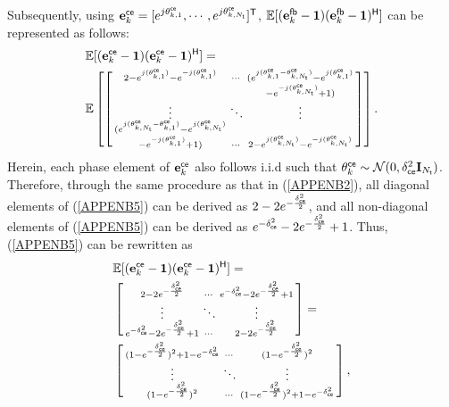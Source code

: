 \documentclass[draftclsnofoot, onecolumn, comsoc, 12pt]{IEEEtran}
\begin{document}
Subsequently, using ${\mathbf{e}_{k}^{\sf{ce}}} = [e^{j\theta_{k,1}^{\sf{ce}}}, \cdots, e^{j\theta_{k, N_{{\sf{t}}}}^{\sf{ce}}}]^{\sf{T}}$, $\mathbb{E}[({\mathbf{e}_{k}^{\sf{fb}}}-\mathbf{1})({\mathbf{e}_{k}^{\sf{fb}}}-\mathbf{1})^{\sf{H}}]$ can be represented as follows:
\begin{align} \label{APPENB5}
   &\mathbb{E}[({\mathbf{e}_{k}^{\sf{ce}}} - \mathbf{1})({\mathbf{e}_{k}^{\sf{ce}}} - \mathbf{1})^{\sf{H}}] =
    \\ 
   & \mathbb{E}\left[ \left[
   \begin{smallmatrix}
    2-e^{j(\theta_{k, 1}^{\sf{ce}})}-e^{-j(\theta_{k, 1}^{\sf{ce}})} &  \cdots &   (e^{j(\theta_{k, 1}^{\sf{ce}}-\theta_{k, N_{{\sf{t}}}}^{\sf{ce}})}-e^{j(\theta_{k, 1}^{\sf{ce}})} \\
   && -e^{-j(\theta_{k, N_{{\sf{t}}}}^{\sf{ce}})} + 1) \\ 
   \vdots&\ddots&\vdots\\
   (e^{j(\theta_{k, N_{{\sf{t}}}}^{\sf{ce}}-\theta_{k, 1}^{\sf{ce}})}-e^{j(\theta_{k, N_{{\sf{t}}}}^{\sf{ce}})} && \\
   -e^{-j(\theta_{k, 1}^{\sf{ce}})} + 1) &  \cdots &  2-e^{j(\theta_{k, N_{{\sf{t}}}}^{\sf{ce}})}-e^{-j(\theta_{k, N_{{\sf{t}}}}^{\sf{ce}})}
   \end{smallmatrix}
   \right] \right].\nonumber
\end{align}
Herein, each phase element of $\mathbf{e}_k^{\sf{ce}}$ also follows i.i.d such that $\mathbf{\theta}_{k}^{\sf{ce}}\sim\mathcal{N}{(0,\delta_{\sf{ce}}^{2} \mathbf{I}_{N_{\sf{t}}})}$.
Therefore, through the same procedure as that in (\ref{APPENB2}), all diagonal elements of (\ref{APPENB5}) can be derived as $2-2e^{-\frac{\delta_{\sf{ce}}^{2}}{2}}$, and all non-diagonal elements of (\ref{APPENB5}) can be derived as $e^{-\delta_{\sf{ce}}^{2}}-2e^{-\frac{\delta_{\sf{ce}}^{2}}{2}}+1$. 
Thus, (\ref{APPENB5}) can be rewritten as 
\begin{align} \label{APPENB6}
   &\mathbb{E}[({\mathbf{e}_{k}^{\sf{ce}}}-\mathbf{1})({\mathbf{e}_{k}^{\sf{ce}}}-\mathbf{1})^{\sf{H}}] =
   \nonumber \\
   &\left[ \begin{smallmatrix}
   2-2e^{-\frac{\delta_{\sf{ce}}^{2}}{2}}&\cdots& e^{-\delta_{\sf{ce}}^{2}}-2e^{-\frac{\delta_{\sf{ce}}^{2}}{2}}+1 \\ \vdots&\ddots&\vdots\\
   e^{-\delta_{\sf{ce}}^{2}}-2e^{-\frac{\delta_{\sf{ce}}^{2}}{2}}+1&\cdots&2-2e^{-\frac{\delta_{\sf{ce}}^{2}}{2}}
   \end{smallmatrix} \right] = \nonumber \\
   &\left[ \begin{smallmatrix}
   (1-e^{-\frac{\delta_{\sf{ce}}^{2}}{2}})^2 + 1 - e^{-\delta_{\sf{ce}}^{2}}&\cdots&(1-e^{-\frac{\delta_{\sf{ce}}^{2}}{2}})^2 \\ 
   \vdots&\ddots&\vdots\\
   (1-e^{-\frac{\delta_{\sf{ce}}^{2}}{2}})^2&\cdots&(1-e^{-\frac{\delta_{\sf{ce}}^{2}}{2}})^2 + 1 - e^{-\delta_{\sf{ce}}^{2}}
   \end{smallmatrix} \right],
\end{align}
\end{document}
